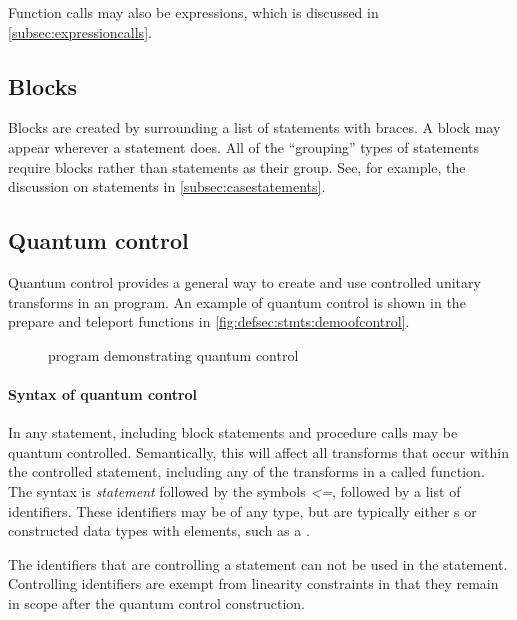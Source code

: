 Function calls may also be expressions, which is discussed in
\vref{subsec:expressioncalls}.

\subsection{Blocks}\label{subsec:blocks}
Blocks are created by surrounding a list of statements with braces. A 
block may appear wherever a statement does.  All of the ``grouping''
types of statements require blocks rather than statements as their group.
See, for example, the discussion on  statements
in \vref{subsec:casestatements}.

\subsection{Quantum control}\label{subsec:quantumcontrol}

Quantum control provides a general way to create and use controlled unitary 
transforms in an \lqpl{} program. 
An example of quantum 
control is shown in the prepare and teleport functions in
 \vref{fig:defsec:stmts:demoofcontrol}.


\begin{figure}[htbp]
\begin{singlespace}

\end{singlespace}
\caption{\lqpl{} program demonstrating quantum control}
\label{fig:defsec:stmts:demoofcontrol}
\end{figure}

\paragraph{Syntax of quantum control}
In \lqpl{} any statement, including block statements and 
procedure calls may be quantum controlled.
Semantically, this will  affect all transforms that occur within
the controlled statement, including
any of the transforms in a called function.
The  syntax is \emph{statement} 
followed by the symbols \emph{<=}, followed
by a list of identifiers.  These identifiers may 
be of any type, but are typically
either \qbit{}s or constructed data types with \qbit{} elements, such as a 
.

The identifiers that are controlling a statement can not be used
in the statement. Controlling identifiers are exempt from
linearity constraints in that they remain in scope after the
quantum control construction.

